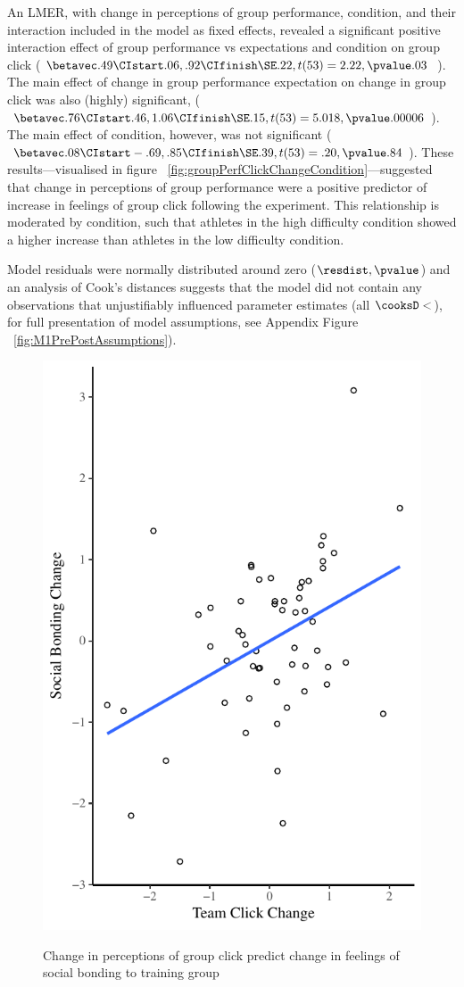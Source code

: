 An LMER, with change in perceptions of group performance, condition, and their interaction included in the model as fixed effects, revealed a significant positive interaction effect of group performance vs expectations and condition on group click
($\betavec .49 \CIstart .06, .92 \CIfinish \SE .22, t(53) = 2.22, \pvalue .03 $ \MR \CR).  The main effect of change in group performance expectation on change in group click was also (highly) significant, ($\betavec .76 \CIstart .46, 1.06 \CIfinish \SE .15, t(53) = 5.018, \pvalue .00006 $). The main effect of condition, however, was not significant ($\betavec .08 \CIstart -.69, .85 \CIfinish \SE .39, t(53) = .20, \pvalue .84 $).
These results---visualised in figure ~\ref{fig:groupPerfClickChangeCondition}---suggested that change in perceptions of group performance were a positive predictor of increase in feelings of group click following the experiment.  This relationship is moderated by condition, such that athletes in the high difficulty condition showed a higher increase than athletes in the low difficulty condition.

Model residuals were normally distributed around zero ($\resdist , \pvalue $) and an analysis of Cook's distances suggests that the model did not contain any observations that unjustifiably influenced parameter estimates (all $\cooksD < $), for full presentation of model assumptions, see Appendix Figure ~\ref{fig:M1PrePostAssumptions}).







\begin{figure}
  \centering
    \includegraphics[width=0.5\linewidth,keepaspectratio] {images/groupClickBondingChangeCondition}
    \label{fig:groupClickBondingChangeCondition}
    \caption{Change in perceptions of group click predict change in feelings of social bonding to training group}
\end{figure}

